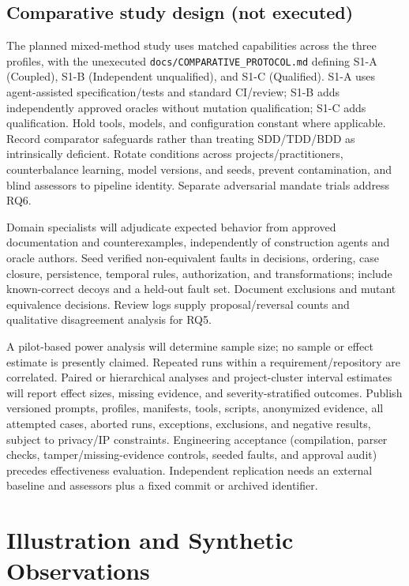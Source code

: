 \documentclass[11pt,a4paper]{article}
\begin{document}
\subsection{Comparative study design (not executed)}
The planned mixed-method study uses matched capabilities across the three profiles, with the unexecuted \texttt{docs/COMPARATIVE\_PROTOCOL.md} defining S1-A (Coupled), S1-B (Independent unqualified), and S1-C (Qualified). S1-A uses agent-assisted specification/tests and standard CI/review; S1-B adds independently approved oracles without mutation qualification; S1-C adds qualification. Hold tools, models, and configuration constant where applicable. Record comparator safeguards rather than treating SDD/TDD/BDD as intrinsically deficient. Rotate conditions across projects/practitioners, counterbalance learning, model versions, and seeds, prevent contamination, and blind assessors to pipeline identity. Separate adversarial mandate trials address RQ6.

Domain specialists will adjudicate expected behavior from approved documentation and counterexamples, independently of construction agents and oracle authors. Seed verified non-equivalent faults in decisions, ordering, case closure, persistence, temporal rules, authorization, and transformations; include known-correct decoys and a held-out fault set. Document exclusions and mutant equivalence decisions. Review logs supply proposal/reversal counts and qualitative disagreement analysis for RQ5.

A pilot-based power analysis will determine sample size; no sample or effect estimate is presently claimed. Repeated runs within a requirement/repository are correlated. Paired or hierarchical analyses and project-cluster interval estimates will report effect sizes, missing evidence, and severity-stratified outcomes. Publish versioned prompts, profiles, manifests, tools, scripts, anonymized evidence, all attempted cases, aborted runs, exceptions, exclusions, and negative results, subject to privacy/IP constraints. Engineering acceptance (compilation, parser checks, tamper/missing-evidence controls, seeded faults, and approval audit) precedes effectiveness evaluation. Independent replication needs an external baseline and assessors plus a fixed commit or archived identifier.

\section{Illustration and Synthetic Observations}\label{sec:observations}
\end{document}
